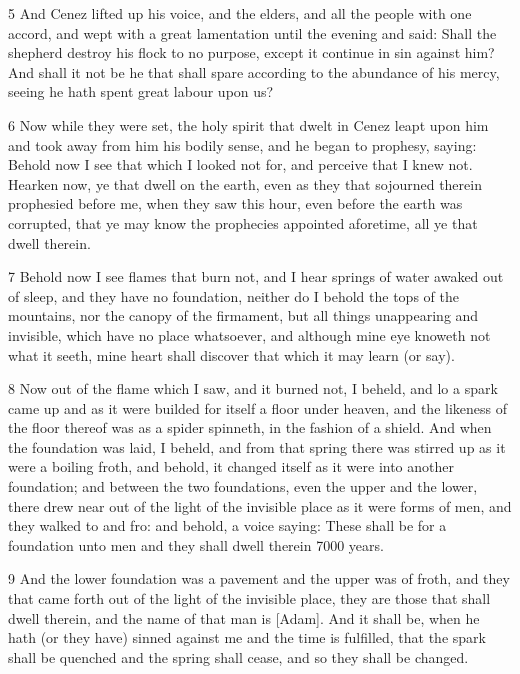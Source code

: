 \par 5 And Cenez lifted up his voice, and the elders, and all the people with one accord, and wept with a great lamentation until the evening and said: Shall the shepherd destroy his flock to no purpose, except it continue in sin against him? And shall it not be he that shall spare according to the abundance of his mercy, seeing he hath spent great labour upon us?

\par 6 Now while they were set, the holy spirit that dwelt in Cenez leapt upon him and took away from him his bodily sense, and he began to prophesy, saying: Behold now I see that which I looked not for, and perceive that I knew not. Hearken now, ye that dwell on the earth, even as they that sojourned therein prophesied before me, when they saw this hour, even before the earth was corrupted, that ye may know the prophecies appointed aforetime, all ye that dwell therein. 

\par 7 Behold now I see flames that burn not, and I hear springs of water awaked out of sleep, and they have no foundation, neither do I behold the tops of the mountains, nor the canopy of the firmament, but all things unappearing and invisible, which have no place whatsoever, and although mine eye knoweth not what it seeth, mine heart shall discover that which it may learn (or say). 

\par 8 Now out of the flame which I saw, and it burned not, I beheld, and lo a spark came up and as it were builded for itself a floor under heaven, and the likeness of the floor thereof was as a spider spinneth, in the fashion of a shield. And when the foundation was laid, I beheld, and from that spring there was stirred up as it were a boiling froth, and behold, it changed itself as it were into another foundation; and between the two foundations, even the upper and the lower, there drew near out of the light of the invisible place as it were forms of men, and they walked to and fro: and behold, a voice saying: These shall be for a foundation unto men and they shall dwell therein 7000 years. 

\par 9 And the lower foundation was a pavement and the upper was of froth, and they that came forth out of the light of the invisible place, they are those that shall dwell therein, and the name of that man is [Adam]. And it shall be, when he hath (or they have) sinned against me and the time is fulfilled, that the spark shall be quenched and the spring shall cease, and so they shall be changed.

